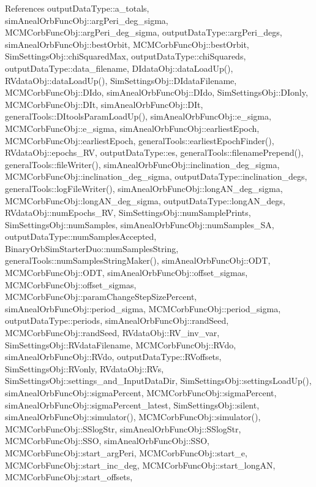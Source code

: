 References output\-Data\-Type\-::a\-\_\-totals, sim\-Aneal\-Orb\-Func\-Obj\-::arg\-Peri\-\_\-deg\-\_\-sigma, M\-C\-M\-Corb\-Func\-Obj\-::arg\-Peri\-\_\-deg\-\_\-sigma, output\-Data\-Type\-::arg\-Peri\-\_\-degs, sim\-Aneal\-Orb\-Func\-Obj\-::best\-Orbit, M\-C\-M\-Corb\-Func\-Obj\-::best\-Orbit, Sim\-Settings\-Obj\-::chi\-Squared\-Max, output\-Data\-Type\-::chi\-Squareds, output\-Data\-Type\-::data\-\_\-filename, D\-Idata\-Obj\-::data\-Load\-Up(), R\-Vdata\-Obj\-::data\-Load\-Up(), Sim\-Settings\-Obj\-::\-D\-Idata\-Filename, M\-C\-M\-Corb\-Func\-Obj\-::\-D\-Ido, sim\-Aneal\-Orb\-Func\-Obj\-::\-D\-Ido, Sim\-Settings\-Obj\-::\-D\-Ionly, M\-C\-M\-Corb\-Func\-Obj\-::\-D\-It, sim\-Aneal\-Orb\-Func\-Obj\-::\-D\-It, general\-Tools\-::\-D\-Itools\-Param\-Load\-Up(), sim\-Aneal\-Orb\-Func\-Obj\-::e\-\_\-sigma, M\-C\-M\-Corb\-Func\-Obj\-::e\-\_\-sigma, sim\-Aneal\-Orb\-Func\-Obj\-::earliest\-Epoch, M\-C\-M\-Corb\-Func\-Obj\-::earliest\-Epoch, general\-Tools\-::earliest\-Epoch\-Finder(), R\-Vdata\-Obj\-::epochs\-\_\-\-R\-V, output\-Data\-Type\-::es, general\-Tools\-::filename\-Prepend(), general\-Tools\-::file\-Writer(), sim\-Aneal\-Orb\-Func\-Obj\-::inclination\-\_\-deg\-\_\-sigma, M\-C\-M\-Corb\-Func\-Obj\-::inclination\-\_\-deg\-\_\-sigma, output\-Data\-Type\-::inclination\-\_\-degs, general\-Tools\-::log\-File\-Writer(), sim\-Aneal\-Orb\-Func\-Obj\-::long\-A\-N\-\_\-deg\-\_\-sigma, M\-C\-M\-Corb\-Func\-Obj\-::long\-A\-N\-\_\-deg\-\_\-sigma, output\-Data\-Type\-::long\-A\-N\-\_\-degs, R\-Vdata\-Obj\-::num\-Epochs\-\_\-\-R\-V, Sim\-Settings\-Obj\-::num\-Sample\-Prints, Sim\-Settings\-Obj\-::num\-Samples, sim\-Aneal\-Orb\-Func\-Obj\-::num\-Samples\-\_\-\-S\-A, output\-Data\-Type\-::num\-Samples\-Accepted, Binary\-Orb\-Sim\-Starter\-Duo\-::num\-Samples\-String, general\-Tools\-::num\-Samples\-String\-Maker(), sim\-Aneal\-Orb\-Func\-Obj\-::\-O\-D\-T, M\-C\-M\-Corb\-Func\-Obj\-::\-O\-D\-T, sim\-Aneal\-Orb\-Func\-Obj\-::offset\-\_\-sigmas, M\-C\-M\-Corb\-Func\-Obj\-::offset\-\_\-sigmas, M\-C\-M\-Corb\-Func\-Obj\-::param\-Change\-Step\-Size\-Percent, sim\-Aneal\-Orb\-Func\-Obj\-::period\-\_\-sigma, M\-C\-M\-Corb\-Func\-Obj\-::period\-\_\-sigma, output\-Data\-Type\-::periods, sim\-Aneal\-Orb\-Func\-Obj\-::rand\-Seed, M\-C\-M\-Corb\-Func\-Obj\-::rand\-Seed, R\-Vdata\-Obj\-::\-R\-V\-\_\-inv\-\_\-var, Sim\-Settings\-Obj\-::\-R\-Vdata\-Filename, M\-C\-M\-Corb\-Func\-Obj\-::\-R\-Vdo, sim\-Aneal\-Orb\-Func\-Obj\-::\-R\-Vdo, output\-Data\-Type\-::\-R\-Voffsets, Sim\-Settings\-Obj\-::\-R\-Vonly, R\-Vdata\-Obj\-::\-R\-Vs, Sim\-Settings\-Obj\-::settings\-\_\-and\-\_\-\-Input\-Data\-Dir, Sim\-Settings\-Obj\-::settings\-Load\-Up(), sim\-Aneal\-Orb\-Func\-Obj\-::sigma\-Percent, M\-C\-M\-Corb\-Func\-Obj\-::sigma\-Percent, sim\-Aneal\-Orb\-Func\-Obj\-::sigma\-Percent\-\_\-latest, Sim\-Settings\-Obj\-::silent, sim\-Aneal\-Orb\-Func\-Obj\-::simulator(), M\-C\-M\-Corb\-Func\-Obj\-::simulator(), M\-C\-M\-Corb\-Func\-Obj\-::\-S\-Slog\-Str, sim\-Aneal\-Orb\-Func\-Obj\-::\-S\-Slog\-Str, M\-C\-M\-Corb\-Func\-Obj\-::\-S\-S\-O, sim\-Aneal\-Orb\-Func\-Obj\-::\-S\-S\-O, M\-C\-M\-Corb\-Func\-Obj\-::start\-\_\-arg\-Peri, M\-C\-M\-Corb\-Func\-Obj\-::start\-\_\-e, M\-C\-M\-Corb\-Func\-Obj\-::start\-\_\-inc\-\_\-deg, M\-C\-M\-Corb\-Func\-Obj\-::start\-\_\-long\-A\-N, M\-C\-M\-Corb\-Func\-Obj\-::start\-\_\-offsets, 